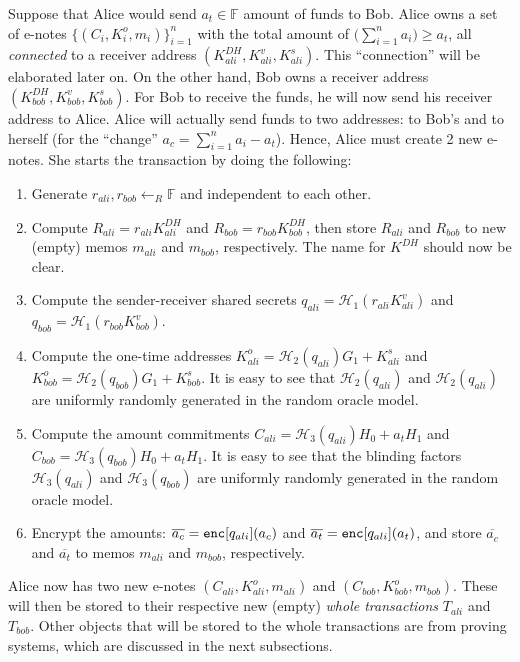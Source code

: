 \documentclass{article}
\begin{document}
Suppose that Alice would send $a_t\in\mathbb{F}$ amount of funds to Bob. Alice owns a set of e-notes $\{(C_i,K_i^o,m_i)\}_{i=1}^n$ with the total amount of $\big(\sum_{i=1}^{n}{a_i}\big)\ge a_t$, all \textit{connected} to a receiver address $(K_{ali}^{DH}, K_{ali}^v, K_{ali}^s)$. This ``connection'' will be elaborated later on. On the other hand, Bob owns a receiver address $(K_{bob}^{DH}, K_{bob}^v, K_{bob}^s)$. For Bob to receive the funds, he will now send his receiver address to Alice. Alice will actually send funds to two addresses: to Bob's and to herself (for the ``change'' $a_c = \sum_{i=1}^{n}{a_i} - a_t$). Hence, Alice must create 2 new e-notes. She starts the transaction by doing the following:
\begin{enumerate}
    \item Generate $r_{ali}, r_{bob}\leftarrow_R\mathbb{F}$ and independent to each other.
    \item Compute $R_{ali} = r_{ali}K_{ali}^{DH}$ and $R_{bob} = r_{bob}K_{bob}^{DH}$, then store $R_{ali}$ and $R_{bob}$ to new (empty) memos $m_{ali}$ and $m_{bob}$, respectively. The name for $K^{DH}$ should now be clear.
    \item Compute the sender-receiver shared secrets $q_{ali} = \mathcal{H}_1(r_{ali}K_{ali}^{v})$ and $q_{bob} = \mathcal{H}_1(r_{bob}K_{bob}^{v})$.
    \item Compute the one-time addresses $K_{ali}^{o} = \mathcal{H}_2(q_{ali})G_1 + K_{ali}^s$ and $K_{bob}^{o} = \mathcal{H}_2(q_{bob})G_1 + K_{bob}^s$. It is easy to see that $\mathcal{H}_2(q_{ali})$ and $\mathcal{H}_2(q_{ali})$ are uniformly randomly generated in the random oracle model.
    \item Compute the amount commitments $C_{ali} = \mathcal{H}_3(q_{ali})H_0 + a_t H_1$ and $C_{bob} = \mathcal{H}_3(q_{bob})H_0 + a_t H_1$. It is easy to see that the blinding factors $\mathcal{H}_3(q_{ali})$ and $\mathcal{H}_3(q_{bob})$ are uniformly randomly generated in the random oracle model.
    \item Encrypt the amounts: $\overline{a_c} = \text{\tt enc}[q_{ali}](a_c)$ and $\overline{a_t} = \text{\tt enc}[q_{ali}](a_t)$, and store $\overline{a_c}$ and $\overline{a_t}$ to memos $m_{ali}$ and $m_{bob}$, respectively.
\end{enumerate}
Alice now has two new e-notes $(C_{ali}, K_{ali}^o, m_{ali})$ and $(C_{bob}, K_{bob}^o, m_{bob})$. These will then be stored to their respective new (empty) \textit{whole transactions} $T_{ali}$ and $T_{bob}$. Other objects that will be stored to the whole transactions are from proving systems, which are discussed in the next subsections.
\end{document}
